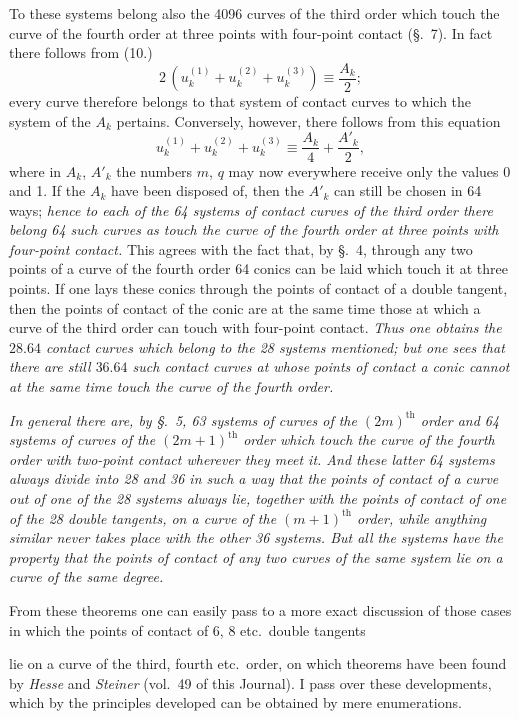 \documentclass{article}
\begin{document}
To these systems belong also the 4096 curves of the third order which touch the curve of the fourth order at three points with four-point contact (§.~7). In fact there follows from (10.)
\[
2\,(u_{k}^{(1)}+u_{k}^{(2)}+u_{k}^{(3)}) \equiv \frac{A_{k}}{2};
\]
every curve therefore belongs to that system of contact curves to which the system of the $A_{k}$ pertains. Conversely, however, there follows from this equation
\[
u_{k}^{(1)}+u_{k}^{(2)}+u_{k}^{(3)} \equiv \frac{A_{k}}{4}+\frac{A'_{k}}{2},
\]
where in $A_{k}$, $A'_{k}$ the numbers $m$, $q$ may now everywhere receive only the values 0 and 1. If the $A_{k}$ have been disposed of, then the $A'_{k}$ can still be chosen in 64 ways; \emph{hence to each of the 64 systems of contact curves of the third order there belong 64 such curves as touch the curve of the fourth order at three points with four-point contact.} This agrees with the fact that, by §.~4, through any two points of a curve of the fourth order 64 conics can be laid which touch it at three points. If one lays these conics through the points of contact of a double tangent, then the points of contact of the conic are at the same time those at which a curve of the third order can touch with four-point contact. \emph{Thus one obtains the $28.64$ contact curves which belong to the 28 systems mentioned; but one sees that there are still $36.64$ such contact curves at whose points of contact a conic cannot at the same time touch the curve of the fourth order.}

\emph{In general there are, by §.~5, 63 systems of curves of the $(2m)^{\text{th}}$ order and 64 systems of curves of the $(2m+1)^{\text{th}}$ order which touch the curve of the fourth order with two-point contact wherever they meet it. And these latter 64 systems always divide into 28 and 36 in such a way that the points of contact of a curve out of one of the 28 systems always lie, together with the points of contact of one of the 28 double tangents, on a curve of the $(m+1)^{\text{th}}$ order, while anything similar never takes place with the other 36 systems. But all the systems have the property that the points of contact of any two curves of the same system lie on a curve of the same degree.}

From these theorems one can easily pass to a more exact discussion of those cases in which the points of contact of 6, 8 etc.\ double tangents

lie on a curve of the third, fourth etc.\ order, on which theorems have been found by \emph{Hesse} and \emph{Steiner} (vol.\ 49 of this Journal). I pass over these developments, which by the principles developed can be obtained by mere enumerations.
\end{document}

